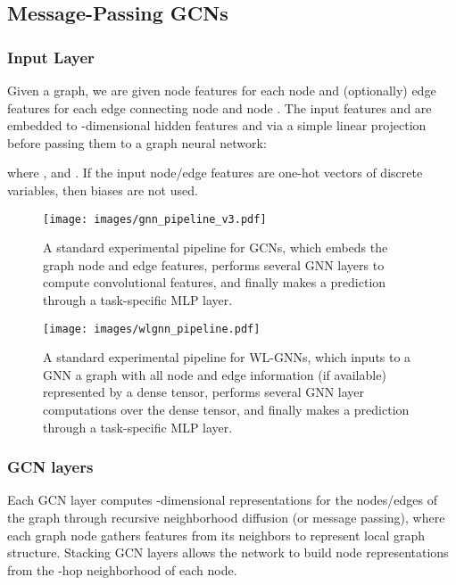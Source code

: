 \documentclass{article}
\begin{document}
\subsection{Message-Passing GCNs}
\label{sec:mpgcns}

\subsubsection{Input Layer}

Given a graph, we are given node features  for each node  and (optionally) edge features  for each edge connecting node  and node .
The input features  and  are embedded to -dimensional hidden features  and  via a simple linear projection before passing them to a graph neural network:

where ,  and . If the input node/edge features are one-hot vectors of discrete variables, then  biases  are not used. 


\begin{figure}[!t]
    \centering
    \texttt{[image: images/gnn\_pipeline\_v3.pdf]}
    \caption{A standard experimental pipeline for GCNs, which embeds the graph node and edge features,
    performs several GNN layers to compute convolutional features,
    and finally makes a prediction through a task-specific MLP layer.} 
    \label{fig:pipeline_mpgcns}
\end{figure}

\begin{figure}[!t]
    \centering
    \texttt{[image: images/wlgnn\_pipeline.pdf]}
    \caption{A standard experimental pipeline for WL-GNNs, which inputs to a GNN a graph with all node and edge information (if available) represented by a dense tensor, performs several GNN layer computations over the dense tensor,
    and finally makes a prediction through a task-specific MLP layer.} 
    \label{fig:pipeline_wlgnns}
\end{figure}

\subsubsection{GCN layers}

Each GCN layer computes -dimensional representations for the nodes/edges of the graph through recursive neighborhood diffusion (or message passing), where each graph node gathers features from its neighbors to represent local graph structure.
Stacking  GCN layers allows the network to build node representations from the -hop neighborhood of each node.
\end{document}
